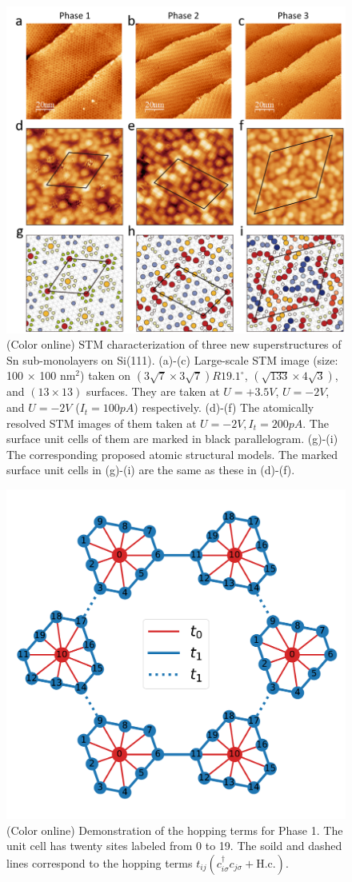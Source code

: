 \documentclass[aps,prb,amsfonts,amsmath,amssymb,showpacs,groupedaddress,superscriptaddress]{revtex4-1}
\begin{document}
\begin{figure}[p]
    \includegraphics[width=0.80\columnwidth]{fig/STMTopographicImage.png}
    \caption{\label{fig:STMTopographicImage}(Color online) STM characterization of three new superstructures of Sn sub-monolayers on Si(111). (a)-(c) Large-scale STM image (size: 100 $\times$ 100 nm$^2$) taken on $(3\sqrt{7} \times 3\sqrt{7})R19.1^\circ$, $(\sqrt{133} \times 4\sqrt{3})$, and $(13 \times 13)$ surfaces. They are taken at $U = +3.5V$, $U = -2V$, and $U = -2V$ ($I_{t} = 100pA$) respectively. (d)-(f) The atomically resolved STM images of them taken at $U = -2V, I_{t} = 200pA$. The surface unit cells of them are marked in black parallelogram. (g)-(i) The corresponding proposed atomic structural models. The marked surface unit cells in (g)-(i) are the same as these in (d)-(f).}
\end{figure}

\begin{figure}[p]
    \includegraphics[width=0.80\columnwidth]{fig/ModelForPhase1.pdf}
    \caption{\label{fig:ModelForPhase1} (Color online) Demonstration of the hopping terms for Phase 1. The unit cell has twenty sites labeled from 0 to 19. The soild and dashed lines correspond to the hopping terms $t_{ij} (c_{i\sigma}^{\dagger} c_{j\sigma} + \text{H.c.})$.}
\end{figure}
\end{document}
